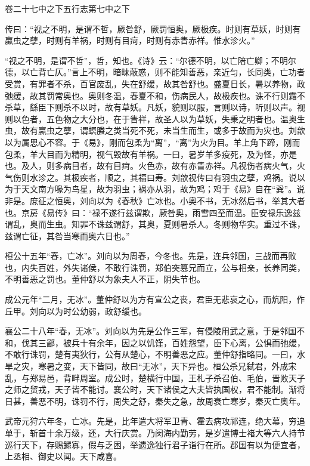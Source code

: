 \documentclass[12pt,UTF8]{ctexbook}
\begin{document}
卷二十七中之下五行志第七中之下



传曰：“视之不明，是谓不哲，厥咎舒，厥罚恒奥，厥极疾。时则有草妖，时则有蠃虫之孽，时则有羊祸，时则有目疴，时则有赤眚赤祥。惟水沴火。”



“视之不明，是谓不哲”，哲，知也。《诗》云：“尔德不明，以亡陪亡卿；不明尔德，以亡背亡仄。”言上不明，暗昧蔽惑，则不能知善恶，亲近匀，长同类，亡功者受赏，有罪者不杀，百官废乱，失在舒缓，故其咎舒也。盛夏日长，暑以养物，政弛缓，故其罚常奥也。奥则冬温，春夏不和，伤病民人，故极疾也。诛不行则霜不杀草，繇臣下则杀不以时，故有草妖。凡妖，貌则以服，言则以诗，听则以声。视则以色者，五色物之大分也，在于眚祥，故圣人以为草妖，失秉之明者也。温奥生虫，故有蠃虫之孽，谓螟螣之类当死不死，未当生而生，或多于故而为灾也。刘歆以为属思心不容。于《易》，刚而包柔为“离”，“离”为火为目。羊上角下蹄，刚而包柔，羊大目而为精明，视气毁故有羊祸。一曰，暑岁羊多疫死，及为怪，亦是也。及人，则多病目者，故有目疴。火色赤，故有赤眚赤祥。凡视伤者病火气，火气伤则水沴之。其极疾者，顺之，其福曰寿。刘歆视传曰有羽虫之孽，鸡祸。说以为于天文南方喙为鸟星，故为羽虫；祸亦从羽，故为鸡；鸡于《易》自在“巽”。说非是。庶征之恒奥，刘向以为《春秋》亡冰也。小奥不书，无冰然后书，举其大者也。京房《易传》曰：“禄不遂行兹谓欺，厥咎奥，雨雪四至而温。臣安禄乐逸兹谓乱，奥而生虫。知罪不诛兹谓舒，其奥，夏则暑杀人。冬则物华实。重过不诛，兹谓亡征，其咎当寒而奥六日也。”



桓公十五年“春，亡冰”。刘向以为周春，今冬也。先是，连兵邻国，三战而再败也，内失百姓，外失诸侯，不敢行诛罚，郑伯突篡兄而立，公与相亲，长养同类，不明善恶之罚也。董仲舒以为象夫人不正，阴失节也。



成公元年“二月，无冰”。董仲舒以为方有宣公之丧，君臣无悲哀之心，而炕阳，作丘甲。刘向以为时公幼弱，政舒缓也。



襄公二十八年“春，无冰”。刘向以为先是公作三军，有侵陵用武之意，于是邻国不和，伐其三鄙，被兵十有余年，因之以饥馑，百姓怨望，臣下心离，公惧而弛缓，不敢行诛罚，楚有夷狄行，公有从楚心，不明善恶之应。董仲舒指略同。一曰，水旱之灾，寒暑之变，天下皆同，故曰“无冰”，天下异也。桓公杀兄弑君，外成宋乱，与郑易邑，背畔周室。成公时，楚横行中国，王札子杀召伯、毛伯，晋败天子之师之贸戎，天子皆不能讨。襄公时，天下诸侯之大夫皆执国权，君不能制。渐将日甚，善恶不明，诛罚不行，周失之舒，秦失之急，故周衰亡寒岁，秦灭亡奥年。



武帝元狩六年冬，亡冰。先是，比年遣大将军卫青、霍去病攻祁连，绝大幕，穷追单于，斩首十余万级，还，大行庆赏。乃闵海内勤劳，是岁遣博士褚大等六人持节巡行天下，存赐鳏寡，假与乏困，举遗逸独行君子诣行在所。郡国有以为便宜者，上丞相、御史以闻。天下咸喜。
\end{document}
